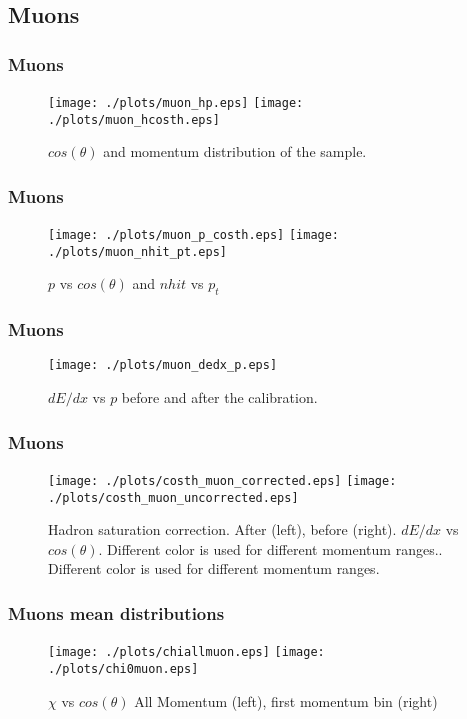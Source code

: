 \documentclass{beamer}
\begin{document}
\subsection{Muons}
\begin{frame}\frametitle{Muons}
\begin{figure}
\texttt{[image: ./plots/muon\_hp.eps]} 
\texttt{[image: ./plots/muon\_hcosth.eps]} 
\caption{$cos(\theta)$ and momentum distribution of the sample.}
\end{figure}
\end{frame}

\begin{frame}\frametitle{Muons}
\begin{figure}
\texttt{[image: ./plots/muon\_p\_costh.eps]} 
\texttt{[image: ./plots/muon\_nhit\_pt.eps]} 
\caption{$p$ vs $cos(\theta)$ and $nhit$ vs $p_{t}$}
\end{figure}
\end{frame}

\begin{frame}\frametitle{Muons}
\begin{figure}
\texttt{[image: ./plots/muon\_dedx\_p.eps]} 
\caption{$dE/dx$ vs $p$ before and after the calibration.}
\end{figure}
\end{frame}

\begin{frame}\frametitle{Muons}
\begin{figure}
\texttt{[image: ./plots/costh\_muon\_corrected.eps]} 
\texttt{[image: ./plots/costh\_muon\_uncorrected.eps]} 
\caption{Hadron saturation correction. After (left), before (right). $dE/dx$ vs $cos(\theta)$. Different color is used for different momentum ranges.. Different color is used for different momentum ranges.}
\end{figure}
\end{frame}

\begin{frame}\frametitle{Muons mean distributions}
\begin{figure}[!htp]
\centering
\texttt{[image: ./plots/chiallmuon.eps]}
\texttt{[image: ./plots/chi0muon.eps]}
\caption{$\chi$ vs $cos(\theta)$ All Momentum (left), first momentum bin (right)}
\end{figure}
\end{frame}
\end{document}
